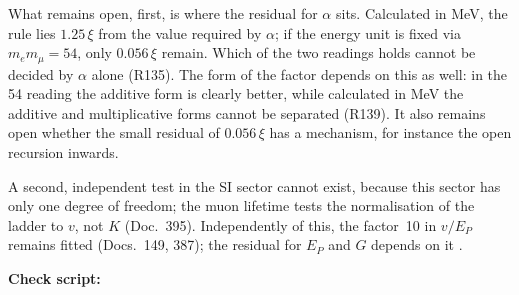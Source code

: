 What remains open, first, is where the residual for $\alpha$ sits. Calculated in MeV, the rule lies
$1.25\,\xi$ from the value required by $\alpha$; if the energy unit is fixed via $m_em_\mu=54$, only
$0.056\,\xi$ remain. Which of the two readings holds cannot be decided by $\alpha$ alone (R135). The
form of the factor depends on this as well: in the 54 reading the additive form is clearly better,
while calculated in MeV the additive and multiplicative forms cannot be separated (R139). It also
remains open whether the small residual of $0.056\,\xi$ has a mechanism, for instance the open
recursion inwards.

A second, independent test in the SI sector cannot exist, because this sector has only one degree of
freedom; the muon lifetime tests the normalisation of the ladder to $v$, not $K$ (Doc.~395).
Independently of this, the factor~10 in $v/E_P$
remains fitted (Docs.~149, 387); the residual for $E_P$ and $G$ depends on it \SM.

\medskip
\noindent\textbf{Check script:} 
